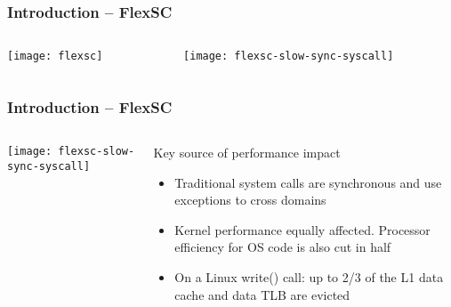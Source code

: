 \begin{frame}[plain]
	\frametitle{Introduction -- FlexSC}
	
	
	\begin{columns}
		
		\begin{column}{.3\textwidth}	
			
			\texttt{[image: flexsc]}
			
			
		\end{column}
		
		\begin{column}{.7\textwidth}
			\texttt{[image: flexsc-slow-sync-syscall]}
		\end{column}
		
	\end{columns}
	
	
\end{frame}	



\begin{frame}[plain]
	\frametitle{Introduction -- FlexSC}
	
	
	\begin{columns}
		
		\begin{column}{.4\textwidth}	
			
			\texttt{[image: flexsc-slow-sync-syscall]}
			
		\end{column}
		
		\begin{column}{.6\textwidth}
			
		Key source of performance impact
		\begin{itemize}
			\item  Traditional system calls are synchronous
			and use exceptions to cross domains
			
			\item Kernel performance equally affected.
Processor efficiency for OS code is also cut
in half			
			\item On a Linux write() call:
			up to 2/3
			of the L1 data cache and data
			TLB are evicted
			

			
		\end{itemize}
	
		\end{column}
		
	\end{columns}
	
	
\end{frame}	



